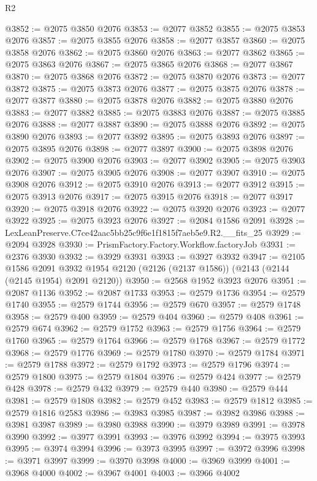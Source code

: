 \begin{lexlean}{R2}
\begin{coremodule}
@3852 := @2075 @3850 @2076
@3853 := @2077 @3852
@3855 := @2075 @3853 @2076
@3857 := @2075 @3855 @2076
@3858 := @2077 @3857
@3860 := @2075 @3858 @2076
@3862 := @2075 @3860 @2076
@3863 := @2077 @3862
@3865 := @2075 @3863 @2076
@3867 := @2075 @3865 @2076
@3868 := @2077 @3867
@3870 := @2075 @3868 @2076
@3872 := @2075 @3870 @2076
@3873 := @2077 @3872
@3875 := @2075 @3873 @2076
@3877 := @2075 @3875 @2076
@3878 := @2077 @3877
@3880 := @2075 @3878 @2076
@3882 := @2075 @3880 @2076
@3883 := @2077 @3882
@3885 := @2075 @3883 @2076
@3887 := @2075 @3885 @2076
@3888 := @2077 @3887
@3890 := @2075 @3888 @2076
@3892 := @2075 @3890 @2076
@3893 := @2077 @3892
@3895 := @2075 @3893 @2076
@3897 := @2075 @3895 @2076
@3898 := @2077 @3897
@3900 := @2075 @3898 @2076
@3902 := @2075 @3900 @2076
@3903 := @2077 @3902
@3905 := @2075 @3903 @2076
@3907 := @2075 @3905 @2076
@3908 := @2077 @3907
@3910 := @2075 @3908 @2076
@3912 := @2075 @3910 @2076
@3913 := @2077 @3912
@3915 := @2075 @3913 @2076
@3917 := @2075 @3915 @2076
@3918 := @2077 @3917
@3920 := @2075 @3918 @2076
@3922 := @2075 @3920 @2076
@3923 := @2077 @3922
@3925 := @2075 @3923 @2076
@3927 := @2084 @1586 @2091
@3928 := LexLeanPreserve.C7ce42aac5bb25c9f6e1f1815f7aeb5e9.R2.__fits_25
@3929 := @2094 @3928
@3930 := PrismFactory.Factory.Workflow.factoryJob
@3931 := @2376 @3930
@3932 := @3929 @3931
@3933 := @3927 @3932
@3947 := @2105
    @1586
    @2091
    @3932
    @1954
    @2120
    (@2126 (@2137 @1586))
    (@2143 (@2144 (@2145 @1954) @2091 @2120))
@3950 := @2568 @1952 @3923 @2076
@3951 := @2087 @1136
@3952 := @2087 @1733
@3953 := @2579 @1736
@3954 := @2579 @1740
@3955 := @2579 @1744
@3956 := @2579 @670
@3957 := @2579 @1748
@3958 := @2579 @400
@3959 := @2579 @404
@3960 := @2579 @408
@3961 := @2579 @674
@3962 := @2579 @1752
@3963 := @2579 @1756
@3964 := @2579 @1760
@3965 := @2579 @1764
@3966 := @2579 @1768
@3967 := @2579 @1772
@3968 := @2579 @1776
@3969 := @2579 @1780
@3970 := @2579 @1784
@3971 := @2579 @1788
@3972 := @2579 @1792
@3973 := @2579 @1796
@3974 := @2579 @1800
@3975 := @2579 @1804
@3976 := @2579 @424
@3977 := @2579 @428
@3978 := @2579 @432
@3979 := @2579 @440
@3980 := @2579 @444
@3981 := @2579 @1808
@3982 := @2579 @452
@3983 := @2579 @1812
@3985 := @2579 @1816 @2583
@3986 := @3983 @3985
@3987 := @3982 @3986
@3988 := @3981 @3987
@3989 := @3980 @3988
@3990 := @3979 @3989
@3991 := @3978 @3990
@3992 := @3977 @3991
@3993 := @3976 @3992
@3994 := @3975 @3993
@3995 := @3974 @3994
@3996 := @3973 @3995
@3997 := @3972 @3996
@3998 := @3971 @3997
@3999 := @3970 @3998
@4000 := @3969 @3999
@4001 := @3968 @4000
@4002 := @3967 @4001
@4003 := @3966 @4002

\end{coremodule}
\end{lexlean}
